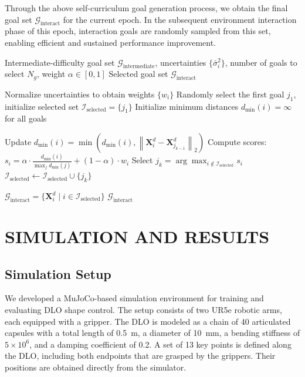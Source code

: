 \documentclass[letterpaper, 10 pt, conference]{ieeeconf}  %
\begin{document}
Through the above self-curriculum goal generation process, we obtain the final goal set $\mathcal{G}_{\text{interact}}$ for the current epoch. In the subsequent environment interaction phase of this epoch, interaction goals are randomly sampled from this set, enabling efficient and sustained performance improvement.


\begin{algorithm}[t]
\caption{Weighted Farthest Point Sampling}
\label{alg:1}
\begin{algorithmic}[1]

\REQUIRE Intermediate-difficulty goal set $\mathcal{G}_{\text{intermediate}}$, uncertainties $\{\bar{\sigma}_i^2\}$, number of goals to select $N_g$, weight $\alpha \in [0,1]$
\ENSURE Selected goal set $\mathcal{G}_{\text{interact}}$

\STATE Normalize uncertainties to obtain weights $\{w_i\}$
\STATE Randomly select the first goal $j_1$, initialize selected set $\mathcal{I}_{\text{selected}} = \{j_1\}$
\STATE Initialize minimum distances $d_{\min}(i) = \infty$ for all goals

    \STATE Update $d_{\min}(i) = \min(d_{\min}(i), \left\|\mathbf{X}_i^d - \mathbf{X}_{j_{k-1}}^d\right\|_2)$
    \STATE Compute scores: $s_i = \alpha \cdot \frac{d_{\min}(i)}{\max_j d_{\min}(j)} + (1-\alpha) \cdot w_i$
    \STATE Select $j_k = \arg\max_{i \notin \mathcal{I}_{\text{selected}}} s_i$
    \STATE $\mathcal{I}_{\text{selected}} \leftarrow \mathcal{I}_{\text{selected}} \cup \{j_k\}$
\ENDFOR

\STATE $\mathcal{G}_{\text{interact}} = \{\mathbf{X}_i^d \mid i \in \mathcal{I}_{\text{selected}}\}$
\RETURN $\mathcal{G}_{\text{interact}}$

\end{algorithmic}
\end{algorithm}










\section{SIMULATION AND RESULTS}

\subsection{Simulation Setup}

We developed a MuJoCo-based simulation environment for training and evaluating DLO shape control. The setup consists of two UR5e robotic arms, each equipped with a gripper. The DLO is modeled as a chain of 40 articulated capsules with a total length of 0.5~m, a diameter of 10~mm, a bending stiffness of \(5 \times 10^6\), and a damping coefficient of 0.2. A set of 13 key points is defined along the DLO, including both endpoints that are grasped by the grippers. Their positions are obtained directly from the simulator.
\end{document}
